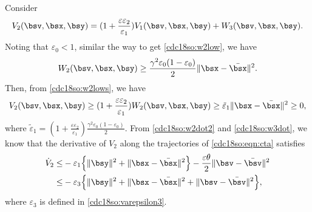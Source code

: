 \documentclass[letterpaper, 10 pt, conference]{ieeeconf}  %
\begin{document}
Consider
\begin{align*}
V_2(\bsv,\bsx,\bsy)=(1+\frac{\varepsilon\varepsilon_2}{\varepsilon_1})V_1(\bsv,\bsx,\bsy)
+W_3(\bsv,\bsx,\bsy).
\end{align*}
Noting that $\varepsilon_0<1$, similar the way to get \eqref{cdc18so:w2low}, we have
\begin{align}\label{cdc18so:w2lows}
W_2(\bsv,\bsx,\bsy)\ge \frac{\gamma^2\varepsilon_0(1-\varepsilon_0)}{2}\|\bsx-\bar{\bsx}\|^2.
\end{align}
Then, from  \eqref{cdc18so:w2lows}, we have
\begin{align}\label{cdc18so:v2low}
V_2(\bsv,\bsx,\bsy)
\ge(1+\frac{\varepsilon\varepsilon_2}{\varepsilon_1})W_2(\bsv,\bsx,\bsy)
\ge\tilde{\varepsilon}_1\|\bsx-\bar{\bsx}\|^2\ge0,
\end{align}
where $\tilde{\varepsilon}_1=(1+\frac{\varepsilon\varepsilon_2}{\varepsilon_1})
\frac{\gamma^2\varepsilon_0(1-\varepsilon_0)}{2}$.
From \eqref{cdc18so:w2dot2} and \eqref{cdc18so:w3dot}, we know that the derivative of $V_2$ along the trajectories of \eqref{cdc18so:eqn:cta} satisfies
\begin{align}\label{cdc18so:v2dot}
\dot{V}_2\le& -\varepsilon_1\Big\{\|\bsy\|^2+\|\bsx-\bar{\bsx}\|^2\Big\}
-\frac{\varepsilon\theta}{2}\|\bsv-\bar{\bsv}\|^2\nonumber\\
\le& -\varepsilon_3\Big\{\|\bsy\|^2+\|\bsx-\bar{\bsx}\|^2+\|\bsv-\bar{\bsv}\|^2\Big\},
\end{align}
where $\varepsilon_3$ is defined in \eqref{cdc18so:varepsilon3}.
\end{document}
